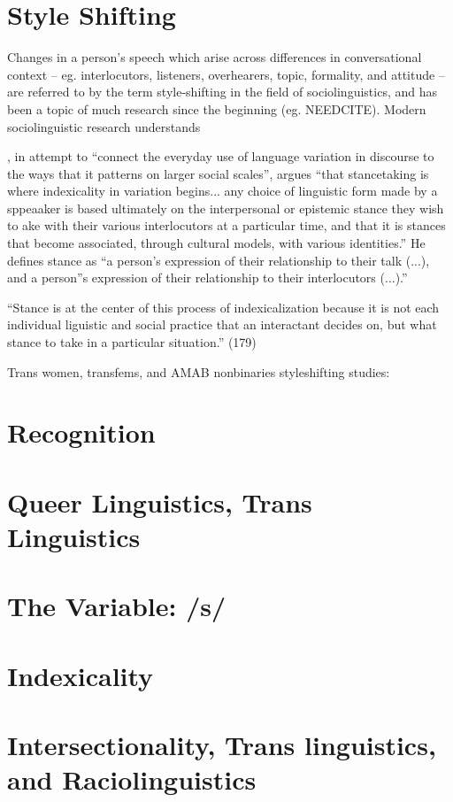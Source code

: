 \section{Style Shifting}
  Changes in a person's speech which arise across differences in conversational context -- eg. interlocutors, listeners, overhearers, topic, formality, and attitude -- are referred to by the term style-shifting in the field of sociolinguistics, and has been a topic of much research since the beginning (eg. NEEDCITE). Modern sociolinguistic research understands 
  
  
\textcite{kiesling_style_2009}, in attempt to ``connect the everyday use of language variation in discourse to the ways that it patterns on larger social scales'', argues ``that stancetaking is where indexicality in variation begins... any choice of linguistic form made by a sppeaaker is based ultimately on the interpersonal or epistemic stance they wish to ake with their various interlocutors at a particular time, and that it is stances that become associated, through cultural models, with various identities.'' He defines stance as ``a person's expression of their relationship to their talk (...), and a person''s expression of their relationship to their interlocutors (...).''

``Stance is at the center of this process of indexicalization because it is not each individual liguistic and social practice that an interactant decides on, but what stance to take in a particular situation.'' (179)


  
  
  Trans women, transfems, and AMAB nonbinaries styleshifting studies:
	
  
  \section{Recognition}
    \section{Queer Linguistics, Trans Linguistics}
    \section{The Variable: /s/}
	\section{Indexicality}
	\section{Intersectionality, Trans linguistics, and Raciolinguistics}
